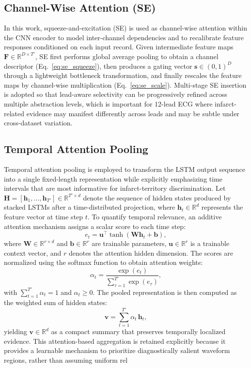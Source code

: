 \documentclass[preprint,12pt]{elsarticle}
\begin{document}
\subsection{Channel-Wise Attention (SE)}
In this work, squeeze-and-excitation (SE) is used as channel-wise attention within the CNN encoder to model inter-channel dependencies and to recalibrate feature responses conditioned on each input record. Given intermediate feature maps $\mathbf{F}\in\mathbb{R}^{D\times T'}$, SE first performs global average pooling to obtain a channel descriptor (Eq.~\ref{eq:se_squeeze}), then produces a gating vector $\mathbf{s}\in(0,1)^D$ through a lightweight bottleneck transformation, and finally rescales the feature maps by channel-wise multiplication (Eq.~\ref{eq:se_scale}). Multi-stage SE insertion is adopted so that lead-aware selectivity can be progressively refined across multiple abstraction levels, which is important for 12-lead ECG where infarct-related evidence may manifest differently across leads and may be subtle under cross-dataset variation.

\subsection{Temporal Attention Pooling}
Temporal attention pooling is employed to transform the LSTM output sequence into a single fixed-length representation while explicitly emphasizing time intervals that are most informative for infarct-territory discrimination. Let $\mathbf{H}=[\mathbf{h}_1,\ldots,\mathbf{h}_{T'}]\in\mathbb{R}^{T'\times d}$ denote the sequence of hidden states produced by stacked LSTMs after a time-distributed projection, where $\mathbf{h}_t\in\mathbb{R}^{d}$ represents the feature vector at time step $t$. To quantify temporal relevance, an additive attention mechanism assigns a scalar score to each time step:
\begin{equation}
e_t=\mathbf{u}^{\top}\tanh(\mathbf{W}\mathbf{h}_t+\mathbf{b}),
\label{eq:attn_score}
\end{equation}
where $\mathbf{W}\in\mathbb{R}^{r\times d}$ and $\mathbf{b}\in\mathbb{R}^{r}$ are trainable parameters, $\mathbf{u}\in\mathbb{R}^{r}$ is a trainable context vector, and $r$ denotes the attention hidden dimension. The scores are normalized using the softmax function to obtain attention weights:
\begin{equation}
\alpha_t=\frac{\exp(e_t)}{\sum_{\tau=1}^{T'}\exp(e_\tau)},
\label{eq:attn_softmax}
\end{equation}
with $\sum_{t=1}^{T'}\alpha_t=1$ and $\alpha_t\ge 0$. The pooled representation is then computed as the weighted sum of hidden states:
\begin{equation}
\mathbf{v}=\sum_{t=1}^{T'}\alpha_t\,\mathbf{h}_t,
\label{eq:attn_pool}
\end{equation}
yielding $\mathbf{v}\in\mathbb{R}^{d}$ as a compact summary that preserves temporally localized evidence. This attention-based aggregation is retained explicitly because it provides a learnable mechanism to prioritize diagnostically salient waveform regions, rather than assuming uniform rel
\end{document}
